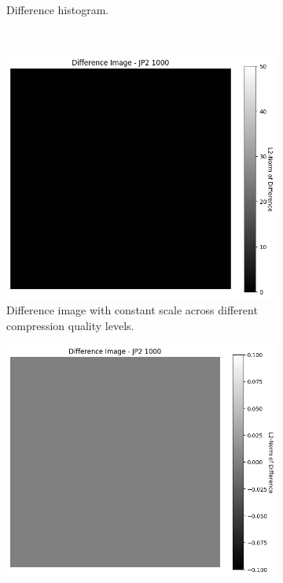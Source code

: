 \begin{figure}[htb]
\begin{subfigure}[b]{0.48\textwidth}
        \caption{Difference histogram.}
        \label{fig:img_quality_comp_jp2_1000_center_histo}
    \end{subfigure}
    \\
    \begin{subfigure}[b]{0.48\textwidth}
        \centering
        \includegraphics[width=\textwidth]{doc/thesis/0_figures/compare_quality/set1/jp2_1000_center_diff_heatmap.png}
        \caption{Difference image with constant scale across different compression quality levels.}
        \label{fig:img_quality_comp_jp2_1000_center_diff}
    \end{subfigure}
    \begin{subfigure}[b]{0.48\textwidth}
        \centering
        \includegraphics[width=\textwidth]{doc/thesis/0_figures/compare_quality/set1/jp2_1000_center_diff_heatmap_rel.png}

\end{subfigure}
\end{figure}
